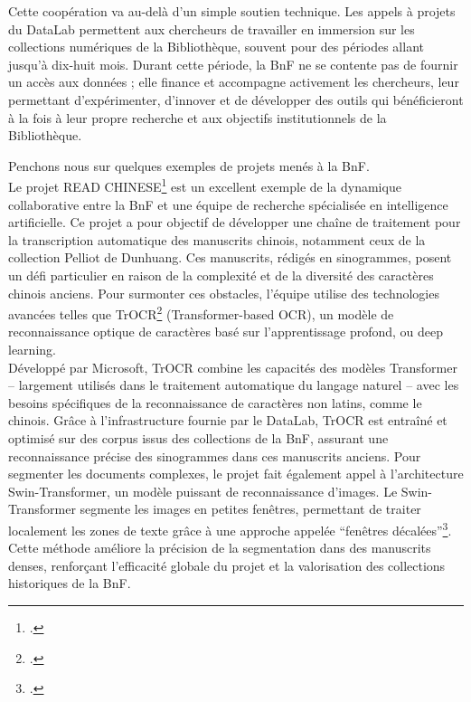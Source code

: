\documentclass[a4paper,12pt,twoside]{book}
\begin{document}
	Cette coopération va au-delà d’un simple soutien technique. Les appels à projets du DataLab permettent aux chercheurs de travailler en immersion sur les collections numériques de la Bibliothèque, souvent pour des périodes allant jusqu’à dix-huit mois. Durant cette période, la BnF ne se contente pas de fournir un accès aux données ; elle finance et accompagne activement les chercheurs, leur permettant d’expérimenter, d’innover et de développer des outils qui bénéficieront à la fois à leur propre recherche et aux objectifs institutionnels de la Bibliothèque.
	
	Penchons nous sur quelques exemples de projets menés à la BnF. 
	\\
	
	Le projet READ CHINESE\footcite{bui_recognizing_2023} est un excellent exemple de la dynamique collaborative entre la BnF et une équipe de recherche spécialisée en intelligence artificielle. Ce projet a pour objectif de développer une chaîne de traitement pour la transcription automatique des manuscrits chinois, notamment ceux de la collection Pelliot de Dunhuang. Ces manuscrits, rédigés en sinogrammes, posent un défi particulier en raison de la complexité et de la diversité des caractères chinois anciens. Pour surmonter ces obstacles, l’équipe utilise des technologies avancées telles que TrOCR\footcite{li_trocr_2023} (Transformer-based OCR), un modèle de reconnaissance optique de caractères basé sur l'apprentissage profond, ou deep learning.
	\\
	
	Développé par Microsoft, TrOCR combine les capacités des modèles Transformer – largement utilisés dans le traitement automatique du langage naturel – avec les besoins spécifiques de la reconnaissance de caractères non latins, comme le chinois. Grâce à l’infrastructure fournie par le DataLab, TrOCR est entraîné et optimisé sur des corpus issus des collections de la BnF, assurant une reconnaissance précise des sinogrammes dans ces manuscrits anciens. Pour segmenter les documents complexes, le projet fait également appel à l’architecture Swin-Transformer, un modèle puissant de reconnaissance d’images. Le Swin-Transformer segmente les images en petites fenêtres, permettant de traiter localement les zones de texte grâce à une approche appelée “fenêtres décalées”\footcite{liu_swin_2021}. Cette méthode améliore la précision de la segmentation dans des manuscrits denses, renforçant l’efficacité globale du projet et la valorisation des collections historiques de la BnF.
	\\
	
\end{document}
